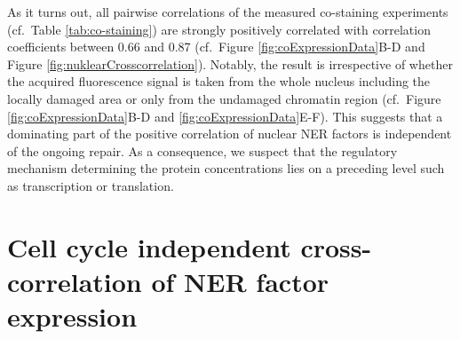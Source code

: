 \noindent As it turns out, all pairwise correlations of the measured co-staining experiments (cf.\ Table \ref{tab:co-staining}) are strongly positively correlated with correlation coefficients between 0.66 and 0.87 (cf.\ Figure \ref{fig:coExpressionData}B-D and Figure \ref{fig:nuklearCrosscorrelation}). Notably, the result is irrespective of whether the acquired fluorescence signal is taken from the whole nucleus including the locally damaged area or only from the undamaged chromatin region (cf.\ Figure \ref{fig:coExpressionData}B-D and \ref{fig:coExpressionData}E-F). This suggests that a dominating part of the positive correlation of nuclear NER factors is independent of the ongoing repair. As a consequence, we suspect that the regulatory mechanism determining the protein concentrations lies on a preceding level such as transcription or translation.\\  



\section {Cell cycle independent cross-correlation of NER factor expression}


